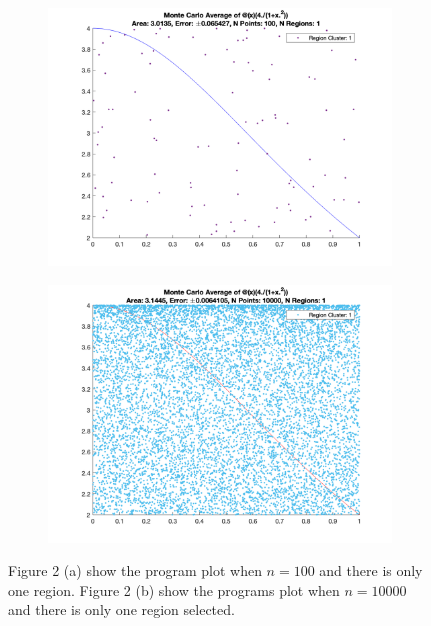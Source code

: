 \documentclass[12pt]{article}
\begin{document}
\begin{figure}[htp]
\centering

\begin{subfigure}{0.49\columnwidth}
\centering
\includegraphics[width=\textwidth]{n_1_region_1.png}
\caption{}
\label{fig:time1}
\end{subfigure}\hfill
\begin{subfigure}{0.49\columnwidth}
\centering
\includegraphics[width=\textwidth]{n_10000_region_1.png}
\caption{}
\label{fig:time2}
\end{subfigure}

\caption{Figure 2 (a) show the program plot when $n = 100$ and there is only one region. Figure 2 (b) show the programs plot when $n = 10000$ and there is only one region selected.}
\label{fig:time}

\end{figure}
\end{document}
